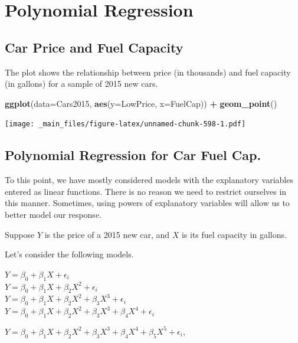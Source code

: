\documentclass[]{book}
\newenvironment{Shaded}{\begin{snugshade}}{\end{snugshade}}
\newcommand{\KeywordTok}[1]{\textcolor[rgb]{0.13,0.29,0.53}{\textbf{#1}}}
\newcommand{\DataTypeTok}[1]{\textcolor[rgb]{0.13,0.29,0.53}{#1}}
\newcommand{\StringTok}[1]{\textcolor[rgb]{0.31,0.60,0.02}{#1}}
\newcommand{\OperatorTok}[1]{\textcolor[rgb]{0.81,0.36,0.00}{\textbf{#1}}}
\newcommand{\NormalTok}[1]{#1}
\begin{document}
\section{Polynomial Regression}\label{polynomial-regression}

\subsection{Car Price and Fuel
Capacity}\label{car-price-and-fuel-capacity}

The plot shows the relationship between price (in thousands) and fuel
capacity (in gallons) for a sample of 2015 new cars.

\begin{Shaded}
\begin{Highlighting}[]
\KeywordTok{ggplot}\NormalTok{(}\DataTypeTok{data=}\NormalTok{Cars2015, }\KeywordTok{aes}\NormalTok{(}\DataTypeTok{y=}\NormalTok{LowPrice, }\DataTypeTok{x=}\NormalTok{FuelCap)) }\OperatorTok{+}\StringTok{ }\KeywordTok{geom_point}\NormalTok{()}
\end{Highlighting}
\end{Shaded}

\texttt{[image: \_main\_files/figure-latex/unnamed-chunk-598-1.pdf]}

\subsection{Polynomial Regression for Car Fuel
Cap.}\label{polynomial-regression-for-car-fuel-cap.}

To this point, we have mostly considered models with the explanatory
variables entered as linear functions. There is no reason we need to
restrict ourselves in this manner. Sometimes, using powers of
explanatory variables will allow us to better model our response.

Suppose \(Y\) is the price of a 2015 new car, and \(X\) is its fuel
capacity in gallons.

Let's consider the following models.

\(Y=\beta_0 + \beta_1 X + \epsilon_i\)\\
\(Y=\beta_0 + \beta_1 X + \beta_2X^2 + \epsilon_i\)\\
\(Y=\beta_0 + \beta_1 X + \beta_2X^2+ \beta_3X^3 + \epsilon_i\)\\
\(Y=\beta_0 + \beta_1 X + \beta_2X^2+ \beta_3X^3+ \beta_4X^4+ \epsilon_i\)

\(Y=\beta_0 + \beta_1 X + \beta_2X^2+ \beta_3X^3+ \beta_4X^4+ \beta_5X^5 +\epsilon_i\),
\end{document}
